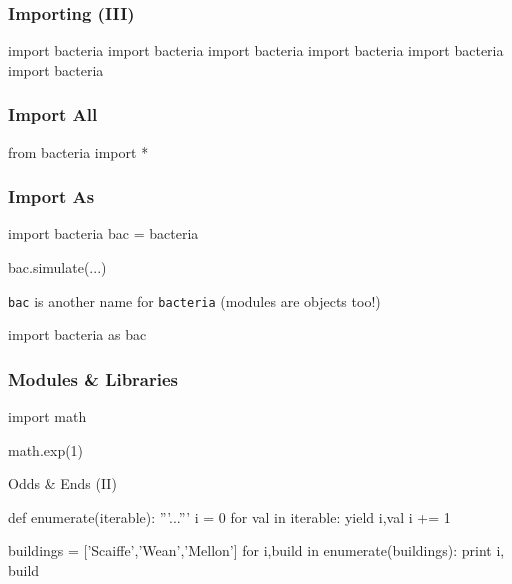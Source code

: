 \begin{frame}[fragile]
\frametitle{Importing (III)}

\begin{python}
import bacteria
import bacteria
import bacteria
import bacteria
import bacteria
import bacteria
\end{python}
\end{frame}

\begin{frame}[fragile]
\frametitle{Import All}

\begin{python}
from bacteria import *
\end{python}

\end{frame}

\begin{frame}[fragile]
\frametitle{Import As}

\begin{python}
import bacteria
bac = bacteria

bac.simulate(...)
\end{python}

\lstinline{bac} is another name for \lstinline{bacteria} (modules are objects too!)

\pause

\begin{python}
import bacteria as bac
\end{python}
\end{frame}

\begin{frame}[fragile]
\frametitle{Modules \& Libraries}
\begin{python}
import math

math.exp(1)
\end{python}
\end{frame}

\begin{frame}[fragile]
Odds \& Ends (II)
\end{frame}

\begin{frame}[fragile]
\begin{python}
def enumerate(iterable):
    '''...'''
    i = 0
    for val in iterable:
        yield i,val
        i += 1
\end{python}

\begin{python}
buildings = ['Scaiffe','Wean','Mellon']
for i,build in enumerate(buildings):
    print i, build
\end{python}
\end{frame}

